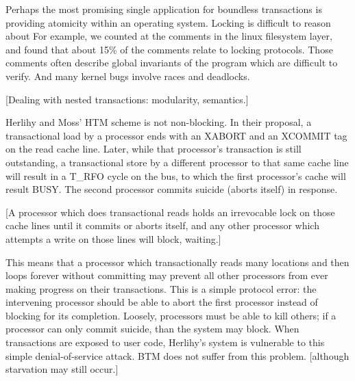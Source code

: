 \documentclass[preprint]{rdbacmconf}
\newcommand{\var}[1]{\ensuremath{\text{\it #1}}}
\begin{document}





Perhaps the most promising single application for boundless
transactions is providing atomicity within an operating system.
Locking is difficult to reason about For example, we counted at the
comments in the linux filesystem layer, and found that about 15\% of
the comments relate to locking protocols.  Those comments often
describe global invariants of the program which are difficult to
verify.  And many kernel bugs involve races and deadlocks.

[Dealing with nested transactions: modularity, semantics.]



  Herlihy
and Moss' HTM scheme is not non-blocking.  In their proposal, a
transactional load by a processor ends with an XABORT and an XCOMMIT
tag on the read cache line.  Later, while that processor's transaction
is still outstanding, a transactional store by a different processor
to that same cache line will result in a T\_RFO cycle on the bus, to
which the first processor's cache will result BUSY.  The second
processor commits suicide (aborts itself) in response.

[A processor which does transactional reads holds an irrevocable lock
on those cache lines until it commits or aborts itself, and any
other processor which attempts a write on those lines will block,
waiting.]

This means that a processor which transactionally reads many locations
and then loops forever without committing may prevent all other
processors from ever making progress on their transactions.  This is a
simple protocol error: the intervening processor should be able to
abort the first processor instead of blocking for its completion.
Loosely, processors must be able to kill others; if a processor can
only commit suicide, than the system may block.  When transactions are
exposed to user code, Herlihy's system is vulnerable to this simple
denial-of-service attack.  BTM does not suffer from this
problem. [although starvation may still occur.]
\end{document}
